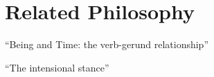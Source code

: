 \chapter{Related Philosophy}\label{appendix:philosophy}

``Being and Time: the verb-gerund relationship''

``The intensional stance''

